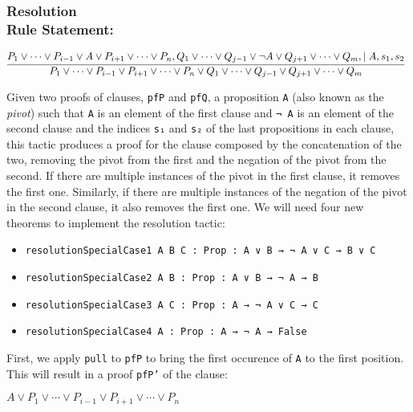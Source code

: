 \subsubsection*{Resolution\\Rule Statement:}
\[
  \infer[]{P_{1} \vee \cdots \vee P_{i - 1} \vee P_{i + 1} \vee \cdots \vee P_{n} \vee Q_{1} \vee \cdots \vee Q_{j - 1} \vee Q_{j + 1} \vee \cdots \vee Q_{m}}{P_{1} \vee \cdots \vee P_{i - 1} \vee A \vee P_{i + 1} \vee \cdots \vee P_{n}, Q_{1} \vee \cdots \vee Q_{j - 1} \vee \neg A \vee Q_{j + 1} \vee \cdots \vee Q_{m}, \mid A, s_{1}, s_{2}}
\]


Given two proofs of clauses, \texttt{pfP} and \texttt{pfQ}, a proposition \texttt{A}
(also known as the \textit{pivot}) such that
\texttt{A} is an element of the first clause and \texttt{¬ A} is an element of the second clause and the indices \texttt{s₁} and \texttt{s₂} of the last propositions in each clause, this tactic produces a proof for the clause composed by the concatenation
of the two, removing the pivot from the first and the negation of the pivot from the second. If there are multiple instances of the pivot in the first clause, it removes
the first one. Similarly, if there are multiple instances of the negation of the pivot
in the second clause, it also removes the first one. We will need four new theorems
to implement the resolution tactic:

\begin{itemize}
  \item \texttt{resolutionSpecialCase1 {A B C : Prop} : A ∨ B → ¬ A ∨ C → B ∨ C}
  \item \texttt{resolutionSpecialCase2 {A B : Prop} : A ∨ B → ¬ A → B}
  \item \texttt{resolutionSpecialCase3 {A C : Prop} : A → ¬ A ∨ C → C}
  \item \texttt{resolutionSpecialCase4 {A : Prop} : A → ¬ A → False}
\end{itemize}

First, we apply \texttt{pull} to \texttt{pfP} to bring the first occurence of \texttt{A} to the first position. This will result
in a proof \texttt{pfP'} of the clause:

\begin{center}
  $A \vee P_{1} \vee \cdots \vee P_{i - 1} \vee P_{i + 1} \vee \cdots \vee P_{n}$
\end{center}

